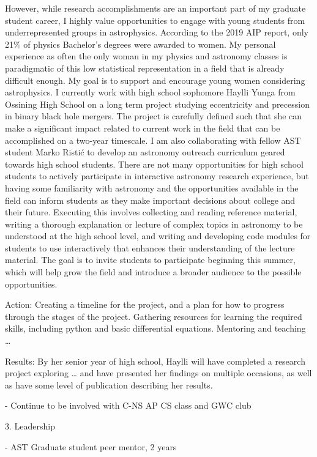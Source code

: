 \documentclass{article}
\begin{document}
However, while research accomplishments are an important part of my graduate student career, I highly value opportunities to engage with young students from underrepresented groups in astrophysics. According to the 2019 AIP report, only 21\% of physics Bachelor’s degrees were awarded to women. My personal experience as often the only woman in my physics and astronomy classes is paradigmatic of this low statistical representation in a field that is already difficult enough. My goal is to support and encourage young women considering astrophysics. I currently work with high school sophomore Haylli Yunga from Ossining High School on a long term project studying eccentricity and precession in binary black hole mergers. The project is carefully defined such that she can make a significant impact related to current work in the field that can be accomplished on a two-year timescale. 
I am also collaborating with fellow AST student Marko Ristić to develop an astronomy outreach curriculum geared towards high school students. There are not many opportunities for high school students to actively participate in interactive astronomy research experience, but having some familiarity with astronomy and the opportunities available in the field can inform students as they make important decisions about college and their future. Executing this involves collecting and reading reference material, writing a thorough explanation or lecture of complex topics in astronomy to be understood at the high school level, and writing and developing code modules for students to use interactively that enhances their understanding of the lecture material. The goal is to invite students to participate beginning this summer, which will help grow the field and introduce a broader audience to the possible opportunities. 


Action: Creating a timeline for the project, and a plan for how to progress through the stages of the project. Gathering resources for learning the required skills, including python and basic differential equations. Mentoring and teaching \ldots

Results: By her senior year of high school, Haylli will have completed a research project exploring … and have presented her findings on multiple occasions, as well as have some level of publication describing her results.


- Continue to be involved with C-NS AP CS class and GWC club

3. Leadership

- AST Graduate student peer mentor, 2 years
\end{document}

